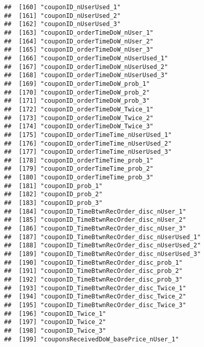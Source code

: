 \documentclass[10pt]{report}
\begin{document}
\begin{verbatim}
##  [160] "couponID_nUserUsed_1"                                 
##  [161] "couponID_nUserUsed_2"                                 
##  [162] "couponID_nUserUsed_3"                                 
##  [163] "couponID_orderTimeDoW_nUser_1"                        
##  [164] "couponID_orderTimeDoW_nUser_2"                        
##  [165] "couponID_orderTimeDoW_nUser_3"                        
##  [166] "couponID_orderTimeDoW_nUserUsed_1"                    
##  [167] "couponID_orderTimeDoW_nUserUsed_2"                    
##  [168] "couponID_orderTimeDoW_nUserUsed_3"                    
##  [169] "couponID_orderTimeDoW_prob_1"                         
##  [170] "couponID_orderTimeDoW_prob_2"                         
##  [171] "couponID_orderTimeDoW_prob_3"                         
##  [172] "couponID_orderTimeDoW_Twice_1"                        
##  [173] "couponID_orderTimeDoW_Twice_2"                        
##  [174] "couponID_orderTimeDoW_Twice_3"                        
##  [175] "couponID_orderTimeTime_nUserUsed_1"                   
##  [176] "couponID_orderTimeTime_nUserUsed_2"                   
##  [177] "couponID_orderTimeTime_nUserUsed_3"                   
##  [178] "couponID_orderTimeTime_prob_1"                        
##  [179] "couponID_orderTimeTime_prob_2"                        
##  [180] "couponID_orderTimeTime_prob_3"                        
##  [181] "couponID_prob_1"                                      
##  [182] "couponID_prob_2"                                      
##  [183] "couponID_prob_3"                                      
##  [184] "couponID_TimeBtwnRecOrder_disc_nUser_1"               
##  [185] "couponID_TimeBtwnRecOrder_disc_nUser_2"               
##  [186] "couponID_TimeBtwnRecOrder_disc_nUser_3"               
##  [187] "couponID_TimeBtwnRecOrder_disc_nUserUsed_1"           
##  [188] "couponID_TimeBtwnRecOrder_disc_nUserUsed_2"           
##  [189] "couponID_TimeBtwnRecOrder_disc_nUserUsed_3"           
##  [190] "couponID_TimeBtwnRecOrder_disc_prob_1"                
##  [191] "couponID_TimeBtwnRecOrder_disc_prob_2"                
##  [192] "couponID_TimeBtwnRecOrder_disc_prob_3"                
##  [193] "couponID_TimeBtwnRecOrder_disc_Twice_1"               
##  [194] "couponID_TimeBtwnRecOrder_disc_Twice_2"               
##  [195] "couponID_TimeBtwnRecOrder_disc_Twice_3"               
##  [196] "couponID_Twice_1"                                     
##  [197] "couponID_Twice_2"                                     
##  [198] "couponID_Twice_3"                                     
##  [199] "couponsReceivedDoW_basePrice_nUser_1"                 

\end{verbatim}
\end{document}
